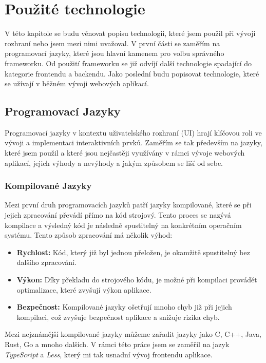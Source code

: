 \chapter{Použité technologie}
\label{ch:technology}
V této kapitole se budu věnovat popisu technologii, které jsem použil při vývoji rozhraní nebo jsem mezi nimi uvažoval. V první části se zaměřím na programovací jazyky, které jsou hlavní kamenem pro volbu správného frameworku. Od použití frameworku se již odvíjí další technologie spadající do kategorie frontendu a backendu. Jako poslední budu popisovat technologie, které se užívají v běžném vývoji webových aplikací.

\section{Programovací Jazyky}
\label{sec:languages}
Programovací jazyky v kontextu uživatelského rozhraní (UI) hrají klíčovou roli ve vývoji a implementaci interaktivních prvků. Zaměřím se tak především na jazyky, které jsem použil a které jsou nejčastěji využívány v rámci vývoje webových aplikací, jejich výhody a nevýhody a jakým způsobem se liší od sebe.

\subsection{Kompilované Jazyky}
\label{subsec:languages-compiled}
Mezi první druh programovacích jazyků patří jazyky kompilované, které se při jejich zpracování převádí přímo na kód strojový. Tento proces se nazývá kompilace a výsledný kód je následně spustitelný na konkrétním operačním systému. Tento způsob zpracování má několik výhod:

\begin{itemize}
    \item \textbf{Rychlost:} Kód, který již byl jednou přeložen, je okamžitě spustitelný bez dalšího zpracování.
    \item \textbf{Výkon:} Díky překladu do strojového kódu, je možné při kompilaci provádět optimalizace, které zvyšují výkon aplikace.
    \item \textbf{Bezpečnost:} Kompilované jazyky ošetřují mnoho chyb již při jejich kompilaci, což zvyšuje bezpečnost aplikace a snižuje rizika chyb.
\end{itemize}

Mezi nejznámější kompilované jazyky můžeme zařadit jazyky jako C, C++, Java, Rust, Go a mnoho dalších. V rámci této práce jsem se zaměřil na jazyk \textit{TypeScript} a \textit{Less}, který mi tak usnadní vývoj frontendu aplikace.

